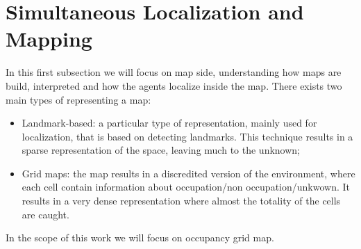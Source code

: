\section{Simultaneous Localization and Mapping}
In this first subsection we will focus on map side, understanding how maps are build, interpreted and how the agents localize inside the map. There exists two main types of representing a map:
\begin{itemize}
    \item Landmark-based: a particular type of representation, mainly used for localization, that is based on detecting landmarks. This technique results in a sparse representation of the space, leaving much to the unknown;
    \item Grid maps: the map results in a discredited version of the environment, where each cell contain information about occupation/non occupation/unkwown. It results in a very dense representation where almost the totality of the cells are caught.
\end{itemize}

In the scope of this work we will focus on occupancy grid map.
